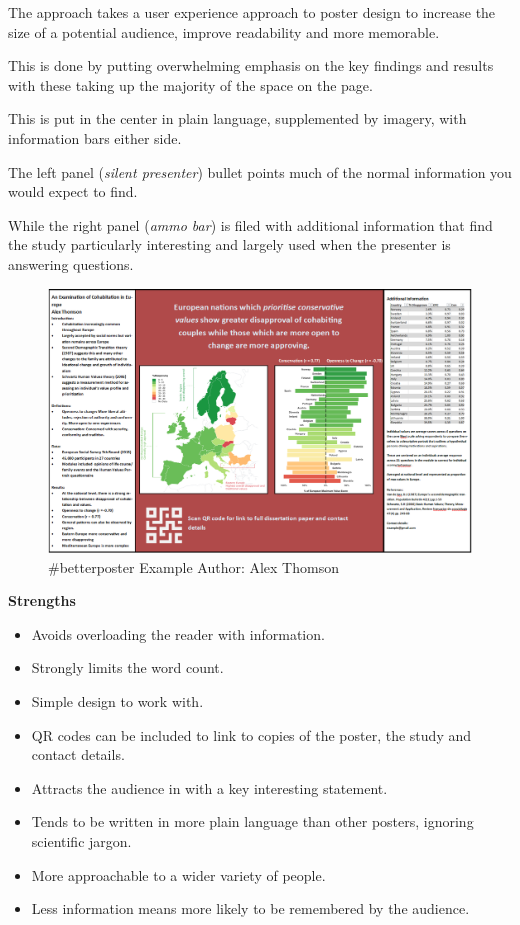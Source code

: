 \documentclass[
  titlepage]{book}
\providecommand{\tightlist}{%
  \setlength{\itemsep}{0pt}\setlength{\parskip}{0pt}}
\begin{document}
The approach takes a user experience approach to poster design to increase the size of a potential audience, improve readability and more memorable.

This is done by putting overwhelming emphasis on the key findings and results with these taking up the majority of the space on the page.

This is put in the center in plain language, supplemented by imagery, with information bars either side.

The left panel (\emph{silent presenter}) bullet points much of the normal information you would expect to find.

While the right panel (\emph{ammo bar}) is filed with additional information that find the study particularly interesting and largely used when the presenter is answering questions.

\begin{figure}
\centering
\includegraphics{img/better poster example 1.png}
\caption{\#betterposter Example Author: Alex Thomson}
\end{figure}

\textbf{Strengths}

\begin{itemize}
\tightlist
\item
  Avoids overloading the reader with information.
\item
  Strongly limits the word count.
\item
  Simple design to work with.
\item
  QR codes can be included to link to copies of the poster, the study and contact details.
\item
  Attracts the audience in with a key interesting statement.
\item
  Tends to be written in more plain language than other posters, ignoring scientific jargon.
\item
  More approachable to a wider variety of people.
\item
  Less information means more likely to be remembered by the audience.
\end{itemize}
\end{document}
